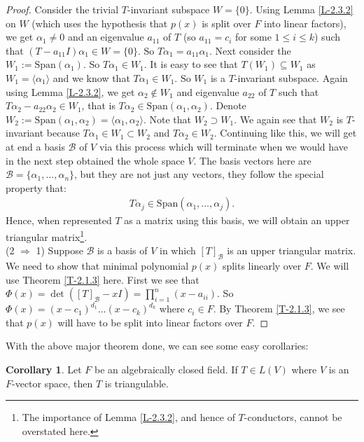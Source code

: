 \documentclass[letterpaper,11pt,twoside]{article}
\theoremstyle{definition}
\theoremstyle{definition}
\theoremstyle{definition}
\theoremstyle{definition}
\theoremstyle{definition}
\theoremstyle{definition}
\theoremstyle{remark}
\theoremstyle{definition}
\newtheorem{corollary}[proposition]{Corollary}
\newcommand{\gen}[1]{\langle #1\rangle}
\newcommand{\Span}[1]{\text{Span}\left(#1\right)}
\begin{document}
\begin{proof}
        Consider the trivial $T$-invariant subspace $W = \{0\}$. Using Lemma \ref{L-2.3.2} on $W$ (which uses the hypothesis that $p(x)$ is split over $F$ into linear factors), we get $\alpha_1 \neq 0$ and an eigenvalue $a_{11}$ of $T$ (so $a_{11} = c_i$ for some $1\le i\le k$) such that $(T-a_{11}I)\alpha_1 \in W = \{0\}$. So $T\alpha_1 = a_{11}\alpha_1$. Next consider the $W_1 := \Span{\alpha_1}$. So $T\alpha_1 \in W_1$. It is easy to see that $T(W_1) \subseteq W_1$ as $W_1 = \gen{\alpha_1}$ and we know that $T\alpha_1 \in W_1$. So $W_1$ is a $T$-invariant subspace. Again using Lemma \ref{L-2.3.2}, we get $\alpha_2\notin W_1$ and eigenvalue $a_{22}$ of $T$ such that $T\alpha_2 -a_{22}\alpha_2 \in W_1$, that is $T\alpha_2 \in \Span{\alpha_1,\alpha_2}$. Denote $W_2 := \Span{\alpha_1,\alpha_2} = \gen{\alpha_1,\alpha_2}$. Note that $W_2 \supset W_1$. We again see that $W_2$ is $T$-invariant because $T\alpha_1 \in W_1 \subset W_2$ and $T\alpha_2 \in W_2$. Continuing like this, we will get at end a basis $\mathcal{B}$ of $V$ via this process which will terminate when we would have in the next step obtained the whole space $V$. The basis vectors here are $\mathcal{B} = \{\alpha_1,\dots,\alpha_n\}$, but they are not just any vectors, they follow the special property that:
        \begin{align*}
            T\alpha_j \in \Span{\alpha_1,\dots, \alpha_j}.
        \end{align*}
        Hence, when represented $T$ as a matrix using this basis, we will obtain an upper triangular matrix\footnote{The importance of Lemma \ref{L-2.3.2}, and hence of $T$-conductors, cannot be overstated here.}.\\
        
        (2 $\Rightarrow$ 1) Suppose $\mathcal{B}$ is a basis of $V$ in which $[T]_\mathcal{B}$ is an upper triangular matrix. We need to show that minimal polynomial $p(x)$ splits linearly over $F$. We will use Theorem \ref{T-2.1.3} here. First we see that $\Phi(x) = \det ([T]_\mathcal{B} - xI) = \prod_{i=1}^n (x-a_{ii})$. So $\Phi(x) = (x-c_1)^{d_1}\dots (x-c_k)^{d_k}$ where $c_i\in F$. By Theorem \ref{T-2.1.3}, we see that $p(x)$ will have to be split into linear factors over $F$.
    \end{proof}
    With the above major theorem done, we can see some easy corollaries:
    \begin{corollary}\label{C-2.4.2}
    Let $F$ be an algebraically closed field. If $T\in L(V)$ where $V$ is an $F$-vector space, then $T$ is triangulable.
    \end{corollary}
\end{document}
